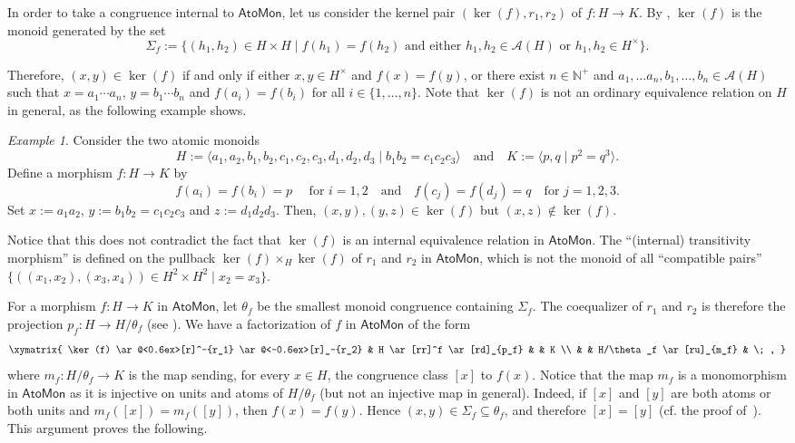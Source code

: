 \documentclass[a4paper,10pt,reqno]{amsart}
\theoremstyle{definition}
\theoremstyle{remark}
\newtheorem{example}[theorem]{Example}
\newcommand{\AtoMon}{\mathsf{AtoMon}}
\begin{document}
In order to take a congruence internal to $\AtoMon$, let us consider the kernel pair $(\ker(f), r_1, r_2)$ of $f\colon H \to K$. By \cite[Theorem 6.5]{CCT}, $\ker(f)$ is the monoid generated by the set
$$
\Sigma_f:=\{(h_1,h_2) \in H \times H \mid f(h_1)=f(h_2) \text{ and either } h_1, h_2 \in \mathscr A(H) \text{ or } h_1, h_2 \in H^\times\} .
$$


Therefore, $(x,y) \in \ker(f)$ if and only if either $x,y \in H^\times$ and $f(x)=f(y)$, or there exist $n \in \mathbb N^+$ and $a_1, \dots a_n, b_1, \dots, b_n \in \mathscr A(H)$ such that $x=a_1\cdots a_n$, $y=b_1\cdots b_n$ and $f(a_i)=f(b_i)$ for all $i \in \{ 1,\dots,n\}$. Note that $\ker(f)$ is not an ordinary equivalence relation on $H$ in general, as the following example shows.

\begin{example}
    Consider the two atomic monoids
    $$
    H:=\langle a_1,a_2, b_1,b_2,c_1,c_2,c_3,d_1,d_2,d_3 \mid b_1b_2=c_1c_2c_3\rangle
     \quad \text{and} \quad K:=\langle p,q\mid p^2=q^3\rangle.
    $$
    Define a morphism
    $f\colon H \to K$ by
    $$
    f(a_i)=f(b_i)=p \quad \text{ for } i=1,2 \quad  \text{and} \quad f(c_j)=f(d_j)=q \quad \text{for } j=1,2,3.
    $$
    Set $x:=a_1a_2$, $y:=b_1b_2=c_1c_2c_3$ and $z:=d_1d_2d_3$. Then, $(x,y),(y,z) \in \ker(f)$ but $(x,z)\notin\ker(f)$.
\end{example}

Notice that this does not contradict the fact that $\ker(f)$ is an internal equivalence relation in $\AtoMon$. The ``(internal) transitivity morphism'' is defined on the pullback $\ker(f)\times_H\ker(f)$ of $r_1$ and $r_2$ in $\AtoMon$, which is not the monoid of all ``compatible pairs'' $\{((x_1,x_2),(x_3,x_4))\in H^2\times H^2 \mid x_2=x_3\}$.

\medskip

For a morphism $f\colon H\to K$ in $\AtoMon$, let $\theta_f$ be the smallest monoid congruence containing $\Sigma_f$. The coequalizer of $r_1$ and $r_2$ is therefore the projection $p_f\colon H \to H/\theta_f$ (see \cite[Proposition~6.1]{CCT}). We have a factorization of $f$ in $\AtoMon$ of the form
\begin{equation}\label{eq:epimonofact}
    \xymatrix{
    \ker(f) \ar@<0.6ex>[r]^-{r_1} \ar@<-0.6ex>[r]_-{r_2} & H \ar[rr]^f \ar[rd]_{p_f} & & K \\
    & & H/\theta_f \ar[ru]_{m_f} & \; ,
    }
\end{equation}
where $m_f\colon H/\theta_f \to K$ is the map sending, for every $x \in H$, the congruence class $[x]$ to $f(x)$. Notice that the map $m_f$ is a monomorphism in $\AtoMon$ as it is injective on units and atoms of $H/\theta_f$ (but not an injective map in general). Indeed, if $[x]$ and $[y]$ are both atoms or both units and $m_f([x])=m_f([y])$, then $f(x)=f(y)$. Hence $(x,y)\in\Sigma_f\subseteq\theta_f$, and therefore $[x]=[y]$ (cf. the proof of~\cite[Proposition~6.1]{CCT}). This argument proves the following.
\end{document}
